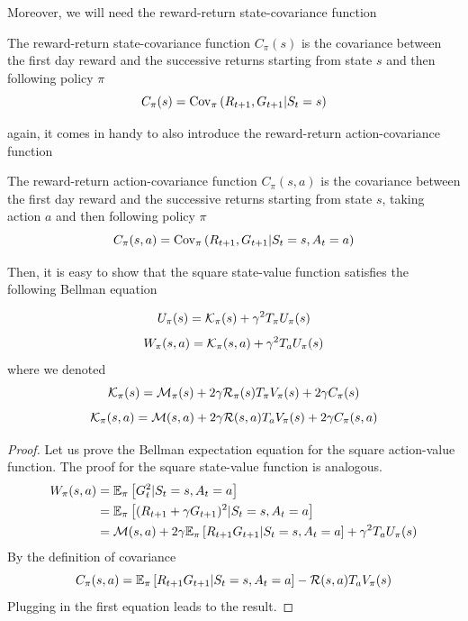 Moreover, we will need the reward-return state-covariance function 
\begin{definition}
	The reward-return state-covariance function $C_\pi(s)$ is the covariance between the first day reward and the successive returns starting from state $s$ and then following policy $\pi$
	\begin{equation}
		C_\pi(s) = \Cov[\pi]{R_{t+1}, G_{t+1} | S_t = s}
	\end{equation}
\end{definition}
again, it comes in handy to also introduce the reward-return action-covariance function 
\begin{definition}
	The reward-return action-covariance function $C_\pi(s,a)$ is the covariance between the first day reward and the successive returns starting from state $s$, taking action $a$ and then following policy $\pi$
	\begin{equation}
		C_\pi(s,a) = \Cov[\pi]{R_{t+1}, G_{t+1} | S_t = s, A_t = a}
	\end{equation}
\end{definition}
Then, it is easy to show that the square state-value function satisfies the following Bellman equation 
\begin{proposition}
\begin{equation}
	U_\pi(s) = \calK_\pi(s) + \gamma^2 T_\pi U_\pi(s)
\end{equation}
\begin{equation}
	\begin{split}
		W_\pi(s,a) = \calK_\pi(s, a) + \gamma^2 T_a U_\pi(s)
	\end{split}
\end{equation}
where we denoted
\begin{equation}
	\mathcal{K}_\pi(s) = \calM_\pi(s) + 2\gamma \calR_\pi(s) T_\pi V_\pi(s) + 2 \gamma C_\pi(s)
\end{equation}
\begin{equation}
	\calK_\pi(s, a) = \calM(s,a) + 2\gamma \calR(s,a) T_a V_\pi(s) + 2 \gamma C_\pi(s, a)
\end{equation}
\end{proposition}
\begin{proof}
	Let us prove the Bellman expectation equation for the square action-value function. The proof for the square state-value function is analogous. 
	\begin{equation*}
		\begin{split}
			W_\pi(s,a) &= \E[\pi]{G_t^2 | S_t = s, A_t = a}\\
					   &= \E[\pi]{(R_{t+1} + \gamma G_{t+1})^2 | S_t = s, A_t = a}\\
					   &= \calM(s,a) + 2\gamma \E[\pi]{R_{t+1}G_{t+1} | S_t = s, A_t = a} + \gamma^2 T_a U_\pi(s)
		\end{split}
	\end{equation*}
	By the definition of covariance
	\begin{equation*}
			C_\pi(s,a) = \E[\pi]{R_{t+1}G_{t+1} | S_t = s, A_t = a} - \calR(s,a) T_a V_\pi(s)
	\end{equation*}
	Plugging in the first equation leads to the result.
\end{proof}
